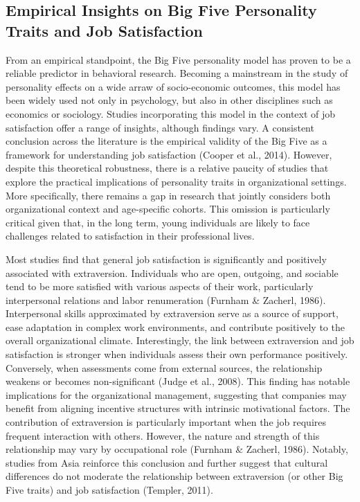 \documentclass[
]{interact}
\begin{document}
\subsection{Empirical Insights on Big Five Personality Traits and Job
Satisfaction}\label{empirical-insights-on-big-five-personality-traits-and-job-satisfaction}

From an empirical standpoint, the Big Five personality model has proven
to be a reliable predictor in behavioral research. Becoming a mainstream
in the study of personality effects on a wide arraw of socio-economic
outcomes, this model has been widely used not only in psychology, but
also in other disciplines such as economics or sociology. Studies
incorporating this model in the context of job satisfaction offer a
range of insights, although findings vary. A consistent conclusion
across the literature is the empirical validity of the Big Five as a
framework for understanding job satisfaction (Cooper et al., 2014).
However, despite this theoretical robustness, there is a relative
paucity of studies that explore the practical implications of
personality traits in organizational settings. More specifically, there
remains a gap in research that jointly considers both organizational
context and age-specific cohorts. This omission is particularly critical
given that, in the long term, young individuals are likely to face
challenges related to satisfaction in their professional lives.

Most studies find that general job satisfaction is significantly and
positively associated with extraversion. Individuals who are open,
outgoing, and sociable tend to be more satisfied with various aspects of
their work, particularly interpersonal relations and labor renumeration
(Furnham \& Zacherl, 1986). Interpersonal skills approximated by
extraversion serve as a source of support, ease adaptation in complex
work environments, and contribute positively to the overall
organizational climate. Interestingly, the link between extraversion and
job satisfaction is stronger when individuals assess their own
performance positively. Conversely, when assessments come from external
sources, the relationship weakens or becomes non-significant (Judge et
al., 2008). This finding has notable implications for the organizational
management, suggesting that companies may benefit from aligning
incentive structures with intrinsic motivational factors. The
contribution of extraversion is particularly important when the job
requires frequent interaction with others. However, the nature and
strength of this relationship may vary by occupational role (Furnham \&
Zacherl, 1986). Notably, studies from Asia reinforce this conclusion and
further suggest that cultural differences do not moderate the
relationship between extraversion (or other Big Five traits) and job
satisfaction (Templer, 2011).
\end{document}

